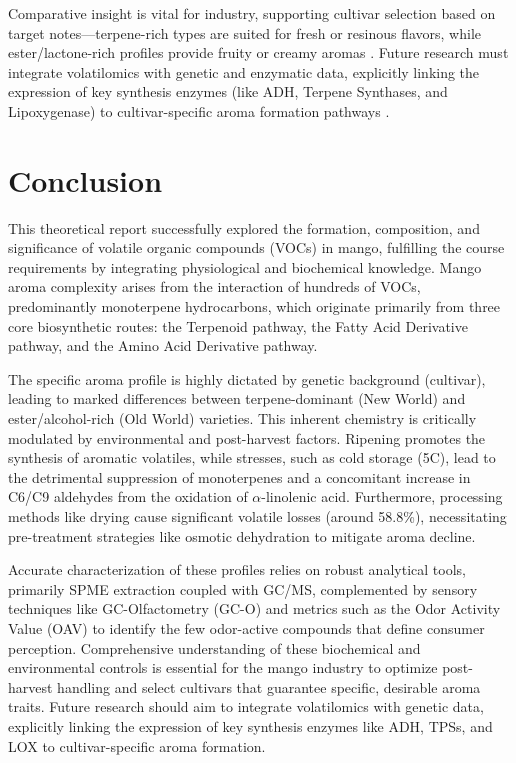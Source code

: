 \vspace{1em}
Comparative insight is vital for industry, supporting cultivar selection based on target notes—terpene-rich types are suited for fresh or resinous flavors, while ester/lactone-rich profiles provide fruity or creamy aromas \cite*{A13_ElHadi2013,A15_Xie2023,A16_Tandel2023}. Future research must integrate volatilomics with genetic and enzymatic data, explicitly linking the expression of key synthesis enzymes (like ADH, Terpene Synthases, and Lipoxygenase) to cultivar-specific aroma formation pathways \cite*{A10_Singh2010,A13_ElHadi2013}.


\section{Conclusion}
This theoretical report successfully explored the formation, composition, and significance of volatile organic compounds (VOCs) in mango, fulfilling the course requirements by integrating physiological and biochemical knowledge. Mango aroma complexity arises from the interaction of hundreds of VOCs, predominantly monoterpene hydrocarbons, which originate primarily from three core biosynthetic routes: the Terpenoid pathway, the Fatty Acid Derivative pathway, and the Amino Acid Derivative pathway.

\vspace{1em}
The specific aroma profile is highly dictated by genetic background (cultivar), leading to marked differences between terpene-dominant (New World) and ester/alcohol-rich (Old World) varieties. This inherent chemistry is critically modulated by environmental and post-harvest factors. Ripening promotes the synthesis of aromatic volatiles, while stresses, such as cold storage (5\textdegree C), lead to the detrimental suppression of monoterpenes and a concomitant increase in C6/C9 aldehydes from the oxidation of $\alpha$-linolenic acid. Furthermore, processing methods like drying cause significant volatile losses (around 58.8\%), necessitating pre-treatment strategies like osmotic dehydration to mitigate aroma decline.

\vspace{1em}
Accurate characterization of these profiles relies on robust analytical tools, primarily SPME extraction coupled with GC/MS, complemented by sensory techniques like GC-Olfactometry (GC-O) and metrics such as the Odor Activity Value (OAV) to identify the few odor-active compounds that define consumer perception. Comprehensive understanding of these biochemical and environmental controls is essential for the mango industry to optimize post-harvest handling and select cultivars that guarantee specific, desirable aroma traits. Future research should aim to integrate volatilomics with genetic data, explicitly linking the expression of key synthesis enzymes like ADH, TPSs, and LOX to cultivar-specific aroma formation.
